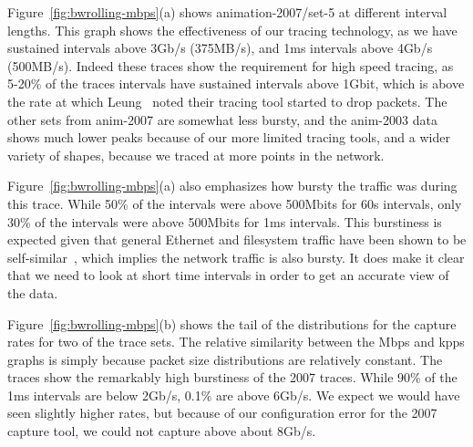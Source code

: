Figure~\ref{fig:bwrolling-mbps}(a) shows animation-2007/set-5 at
different interval lengths.  This graph shows the effectiveness of our
tracing technology, as we have sustained intervals above 3Gb/s
(375MB/s), and 1ms intervals above 4Gb/s (500MB/s). Indeed these
traces show the requirement for high speed tracing, as 5-20\% of the
traces intervals have sustained intervals above 1Gbit, which is above
the rate at which Leung~\cite{LeungUsenix08} noted their tracing tool
started to drop packets.  The other sets from anim-2007 are somewhat
less bursty, and the anim-2003 data shows much lower peaks because of
our more limited tracing tools, and a wider variety of shapes, because
we traced at more points in the network.

Figure~\ref{fig:bwrolling-mbps}(a) also emphasizes how bursty the traffic was
during this trace. While 50\% of the intervals were above 500Mbits for
60s intervals, only 30\% of the intervals were above 500Mbits for 1ms
intervals.  This burstiness is expected given that
general Ethernet and filesystem
traffic have been shown to be
self-similar~\cite{Gribble98selfsimilar,Leland94selfsimilar}, which implies the network traffic is also bursty.
It does make it clear that we need to look at short time intervals in
order to get an accurate view of the data.

Figure~\ref{fig:bwrolling-mbps}(b) shows the tail of the distributions for
the capture rates for two of the trace sets.  The relative similarity
between the Mbps and kpps graphs is simply because packet size
distributions are relatively constant.  The traces show the remarkably high
burstiness of the 2007 traces.  While 90\% of the 1ms intervals are
below 2Gb/s, 0.1\% are above 6Gb/s.  We expect we would have seen
slightly higher rates, but because of our configuration error for the
2007 capture tool, we could not capture above about 8Gb/s.

\begin{figure*}
\caption{Bandwidth measured in the collection process.  In figure (b),
animation-2007/set-5 at different intervals is the top group of 4 lines, and
animation-2003/set-12 is the bottom group of 4 lines. With 60s intervals, 
animation-2003/set-12 does not show the 0.9999 quantile 
because there were insufficient data points.}
\label{fig:bwrolling-mbps}
\end{figure*}

